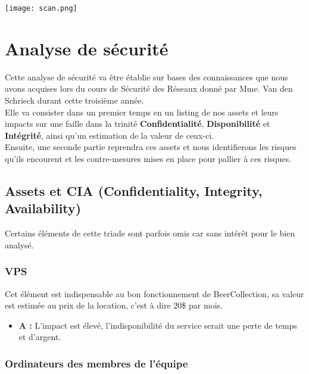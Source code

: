 \documentclass{report}
\begin{document}
		\texttt{[image: scan.png]}



\chapter{Analyse de sécurité} %

	Cette analyse de sécurité va être établie sur bases des connaissances que nous avons acquises lors du cours de Sécurité des Réseaux donné par Mme. Van den Schrieck durant cette troisième année.\\

	Elle va consister dans un premier temps en un listing de nos assets et leurs impacts sur une faille dans la trinité \textbf{Confidentialité}, \textbf{Disponibilité} et \textbf{Intégrité}, ainsi qu'un estimation de la valeur de ceux-ci.\\
	Ensuite, une seconde partie reprendra ces assets et nous identifierons les risques qu'ils encourent et les contre-mesures mises en place pour pallier à ces risques.\\

	\section{Assets et CIA (Confidentiality, Integrity, Availability)}

		Certains éléments de cette triade sont parfois omis car sans intérêt pour le bien analysé.\\

		\subsection{VPS}

			Cet élément est indispensable au bon fonctionnement de BeerCollection, sa valeur est estimée au prix de la location, c'est à dire 20\$ par mois.\\

			\begin{itemize}
				\item \textbf{A :} L'impact est élevé, l'indisponibilité du service serait une perte de temps et d'argent.\\
			\end{itemize}

		\subsection{Ordinateurs des membres de l'équipe}
\end{document}
